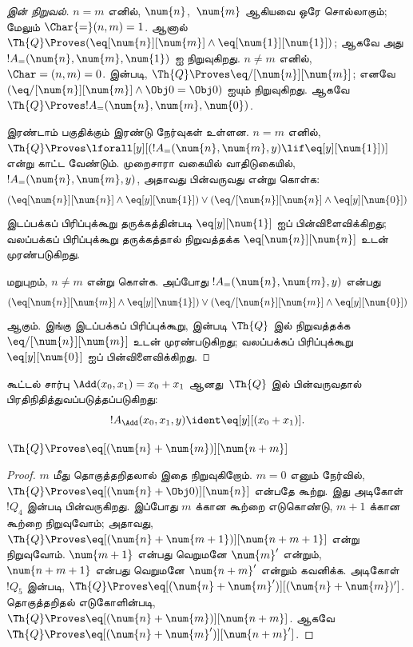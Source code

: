 \documentclass[../../../include/open-logic-section]{subfiles}
\begin{document}
\begin{proof}[ இன் நிறுவல்]
$n = m$ எனில், $\num{n}$,~$\num{m}$ ஆகியவை ஒரே சொல்லாகும்; மேலும்
$\Char{=}(n, m) = 1$. ஆனால் $\Th{Q} \Proves
(\eq[\num{n}][\num{m}] \land \eq[\num{1}][\num{1}])$; ஆகவே அது
$!A_=(\num{n}, \num{m}, \num{1})$ ஐ நிறுவுகிறது. $n \neq m$ எனில்,
$\Char=(n, m) = 0$.  இன்படி,
$\Th{Q} \Proves \eq/[\num{n}][\num{m}]$; எனவே
$(\eq/[\num{n}][\num{m}] \land \Obj 0 = \Obj 0)$ ஐயும் நிறுவுகிறது.
ஆகவே $\Th{Q} \Proves !A_=(\num{n}, \num{m}, \num{0})$.

இரண்டாம் பகுதிக்கும் இரண்டு நேர்வுகள் உள்ளன. $n = m$ எனில்,
$\Th{Q} \Proves \lforall[y][(!A_=(\num{n}, \num{m}, y)
  \lif \eq[y][\num{1}])]$ என்று காட்ட வேண்டும். முறைசாரா வகையில்
வாதிடுகையில், $!A_=(\num{n}, \num{m}, y)$, அதாவது பின்வருவது என்று கொள்க:
\[
(\eq[\num{n}][\num{n}] \land \eq[y][\num{1}]) \lor
(\eq/[\num{n}][\num{n}] \land \eq[y][\num{0}])
\]
இடப்பக்கப் பிரிப்புக்கூறு தருக்கத்தின்படி $\eq[y][\num{1}]$ ஐப்
பின்விளைவிக்கிறது; வலப்பக்கப் பிரிப்புக்கூறு தருக்கத்தால் நிறுவத்தக்க
$\eq[\num{n}][\num{n}]$ உடன் முரண்படுகிறது.

மறுபுறம், $n \neq m$ என்று கொள்க. அப்போது $!A_=(\num{n},
\num{m}, y)$ என்பது
\[
(\eq[\num{n}][\num{m}] \land \eq[y][\num{1}]) \lor
(\eq/[\num{n}][\num{m}] \land \eq[y][\num{0}])
\]
ஆகும். இங்கு இடப்பக்கப் பிரிப்புக்கூறு,  இன்படி
$\Th{Q}$ இல் நிறுவத்தக்க $\eq/[\num{n}][\num{m}]$ உடன் முரண்படுகிறது;
வலப்பக்கப் பிரிப்புக்கூறு $\eq[y][\num{0}]$ ஐப் பின்விளைவிக்கிறது.
\end{proof}

\begin{prop}
கூட்டல் சார்பு $\Add(x_0, x_1) = x_0+x_1$ ஆனது~$\Th{Q}$ இல்
பின்வருவதால் பிரதிநிதித்துவப்படுத்தப்படுகிறது:
\[
  !A_{\Add}(x_0, x_1, y) \ident \eq[y][(x_0 + x_1)].
\]
\end{prop}

\begin{lem}
$\Th{Q} \Proves \eq[(\num{n} + \num{m})][\num{n+m}]$
\end{lem}

\begin{proof}
$m$ மீது தொகுத்தறிதலால் இதை நிறுவுகிறோம். $m = 0$ எனும் நேர்வில்,
$\Th{Q} \Proves \eq[(\num{n} + \Obj 0)][\num{n}]$ என்பதே கூற்று.
இது அடிகோள்~$!Q_4$ இன்படி பின்வருகிறது. இப்போது $m$ க்கான கூற்றை
எடுகொண்டு, $m+1$ க்கான கூற்றை நிறுவுவோம்; அதாவது,
$\Th{Q} \Proves \eq[(\num{n} + \num{m+1})][\num{n+m+1}]$ என்று
நிறுவுவோம். $\num{m+1}$ என்பது வெறுமனே $\num{m}'$ என்றும்,
$\num{n+m+1}$ என்பது வெறுமனே $\num{n+m}'$ என்றும் கவனிக்க. அடிகோள்
$!Q_5$ இன்படி, $\Th{Q} \Proves \eq[(\num{n} +
\num{m}')][(\num{n}+\num{m})']$. தொகுத்தறிதல் எடுகோளின்படி,
$\Th{Q} \Proves \eq[(\num{n} + \num{m})][\num{n+m}]$. ஆகவே
$\Th{Q} \Proves \eq[(\num{n} + \num{m}')][\num{n+m}']$.
\end{proof}
\end{document}
